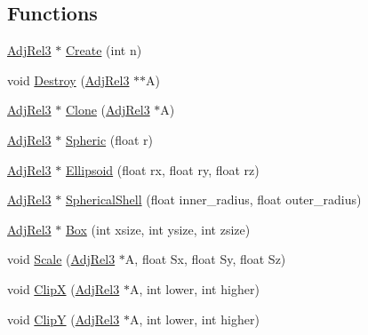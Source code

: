 \subsection*{Functions}
\begin{DoxyCompactItemize}
\item 
\hyperlink{namespacegft_1_1AdjRel3_a0d54e2f148bf5636f3a3faf70d4eb5ae}{Adj\-Rel3} $\ast$ \hyperlink{namespacegft_1_1AdjRel3_a7dfeb22ab8f6eb84642291bac033a10b}{Create} (int n)
\item 
void \hyperlink{namespacegft_1_1AdjRel3_ad6f126ce86bde099aa796178a82fff3e}{Destroy} (\hyperlink{namespacegft_1_1AdjRel3_a0d54e2f148bf5636f3a3faf70d4eb5ae}{Adj\-Rel3} $\ast$$\ast$A)
\item 
\hyperlink{namespacegft_1_1AdjRel3_a0d54e2f148bf5636f3a3faf70d4eb5ae}{Adj\-Rel3} $\ast$ \hyperlink{namespacegft_1_1AdjRel3_ad4dd76816f2794ea9d8305a8de5651c7}{Clone} (\hyperlink{namespacegft_1_1AdjRel3_a0d54e2f148bf5636f3a3faf70d4eb5ae}{Adj\-Rel3} $\ast$A)
\item 
\hyperlink{namespacegft_1_1AdjRel3_a0d54e2f148bf5636f3a3faf70d4eb5ae}{Adj\-Rel3} $\ast$ \hyperlink{namespacegft_1_1AdjRel3_aec5edb5a47fb598c812b46af5ab99280}{Spheric} (float r)
\item 
\hyperlink{namespacegft_1_1AdjRel3_a0d54e2f148bf5636f3a3faf70d4eb5ae}{Adj\-Rel3} $\ast$ \hyperlink{namespacegft_1_1AdjRel3_a14dbef9a69129eb93ac447d6d52ea0a3}{Ellipsoid} (float rx, float ry, float rz)
\item 
\hyperlink{namespacegft_1_1AdjRel3_a0d54e2f148bf5636f3a3faf70d4eb5ae}{Adj\-Rel3} $\ast$ \hyperlink{namespacegft_1_1AdjRel3_ab466ea16f4dcc2f9c45e495c4610e8cc}{Spherical\-Shell} (float inner\-\_\-radius, float outer\-\_\-radius)
\item 
\hyperlink{namespacegft_1_1AdjRel3_a0d54e2f148bf5636f3a3faf70d4eb5ae}{Adj\-Rel3} $\ast$ \hyperlink{namespacegft_1_1AdjRel3_a136e1245bbd9c5233037e1c6c45b0f85}{Box} (int xsize, int ysize, int zsize)
\item 
void \hyperlink{namespacegft_1_1AdjRel3_ab67435f8f4a806c6b4989ee12501738f}{Scale} (\hyperlink{namespacegft_1_1AdjRel3_a0d54e2f148bf5636f3a3faf70d4eb5ae}{Adj\-Rel3} $\ast$A, float Sx, float Sy, float Sz)
\item 
void \hyperlink{namespacegft_1_1AdjRel3_ad463fc40358db17d22f44d38a4489404}{Clip\-X} (\hyperlink{namespacegft_1_1AdjRel3_a0d54e2f148bf5636f3a3faf70d4eb5ae}{Adj\-Rel3} $\ast$A, int lower, int higher)
\item 
void \hyperlink{namespacegft_1_1AdjRel3_a155462e5056978331864d72d022ea554}{Clip\-Y} (\hyperlink{namespacegft_1_1AdjRel3_a0d54e2f148bf5636f3a3faf70d4eb5ae}{Adj\-Rel3} $\ast$A, int lower, int higher)
$$
\end{DoxyCompactItemize}
